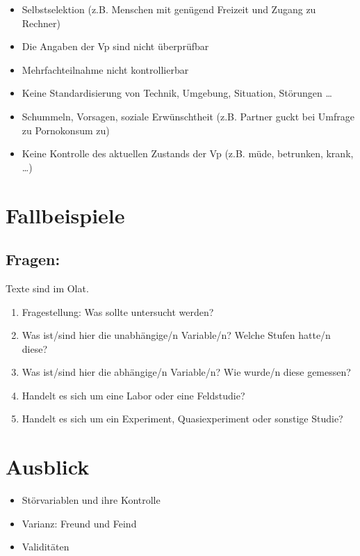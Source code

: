 \documentclass[
]{book}
\providecommand{\tightlist}{%
  \setlength{\itemsep}{0pt}\setlength{\parskip}{0pt}}
\begin{document}
\begin{itemize}
\tightlist
\item
  Selbstselektion (z.B. Menschen mit genügend Freizeit und Zugang zu Rechner)
\item
  Die Angaben der Vp sind nicht überprüfbar
\item
  Mehrfachteilnahme nicht kontrollierbar
\item
  Keine Standardisierung von Technik, Umgebung, Situation, Störungen \ldots{}
\item
  Schummeln, Vorsagen, soziale Erwünschtheit (z.B. Partner guckt bei Umfrage zu Pornokonsum zu)
\item
  Keine Kontrolle des aktuellen Zustands der Vp (z.B. müde, betrunken, krank, \ldots)
\end{itemize}

\hypertarget{fallbeispiele}{%
\section{Fallbeispiele}\label{fallbeispiele}}

\hypertarget{fragen}{%
\subsection{Fragen:}\label{fragen}}

Texte sind im Olat.

\begin{enumerate}
\def\labelenumi{\arabic{enumi}.}
\tightlist
\item
  Fragestellung: Was sollte untersucht werden?
\item
  Was ist/sind hier die unabhängige/n Variable/n? Welche Stufen hatte/n diese?
\item
  Was ist/sind hier die abhängige/n Variable/n? Wie wurde/n diese gemessen?
\item
  Handelt es sich um eine Labor oder eine Feldstudie?
\item
  Handelt es sich um ein Experiment, Quasiexperiment oder sonstige Studie?
\end{enumerate}

\hypertarget{ausblick-1}{%
\section{Ausblick}\label{ausblick-1}}

\begin{itemize}
\tightlist
\item
  Störvariablen und ihre Kontrolle
\item
  Varianz: Freund und Feind
\item
  Validitäten
\end{itemize}
\end{document}
